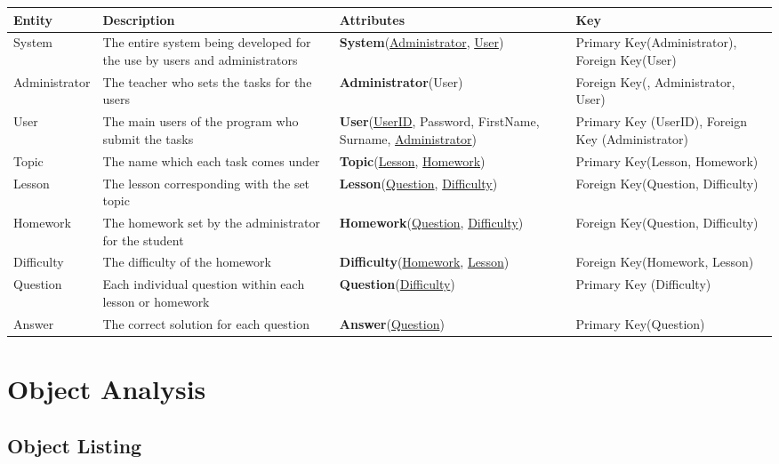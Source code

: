 \begin{center}
\begin{tabular}{|p{3cm}|p{4cm}|p{4cm}|p{3cm}|} \hline
\textbf{Entity} & \textbf{Description} & \textbf{Attributes} & \textbf{Key} \\ \hline
System & The entire system being developed for the use by users and administrators & \textbf{System}(\underline{Administrator}, \underline{User}) & Primary Key(Administrator), Foreign Key(User) \\ \hline
Administrator & The teacher who sets the tasks for the users & \textbf{Administrator}(User) & Foreign Key(, Administrator, User) \\ \hline
User & The main users of the program who submit the tasks & \textbf{User}(\underline{UserID}, Password, FirstName, Surname, \underline{Administrator}) & Primary Key (UserID), Foreign Key (Administrator) \\ \hline
Topic & The name which each task comes under & \textbf{Topic}(\underline{Lesson}, \underline{Homework}) & Primary Key(Lesson, Homework) \\ \hline
Lesson & The lesson corresponding with the set topic & \textbf{Lesson}(\underline{Question}, \underline{Difficulty}) & Foreign Key(Question, Difficulty) \\ \hline
Homework & The homework set by the administrator for the student & \textbf{Homework}(\underline{Question}, \underline{Difficulty}) & Foreign Key(Question, Difficulty) \\ \hline
Difficulty & The difficulty of the homework & \textbf{Difficulty}(\underline{Homework}, \underline{Lesson}) & Foreign Key(Homework, Lesson) \\ \hline
Question & Each individual question within each lesson or homework & \textbf{Question}(\underline{Difficulty}) & Primary Key (Difficulty) \\ \hline
Answer & The correct solution for each question & \textbf{Answer}(\underline{Question}) & Primary Key(Question) \\ \hline
\end{tabular}
\end{center}

\section{Object Analysis}

\subsection{Object Listing}

